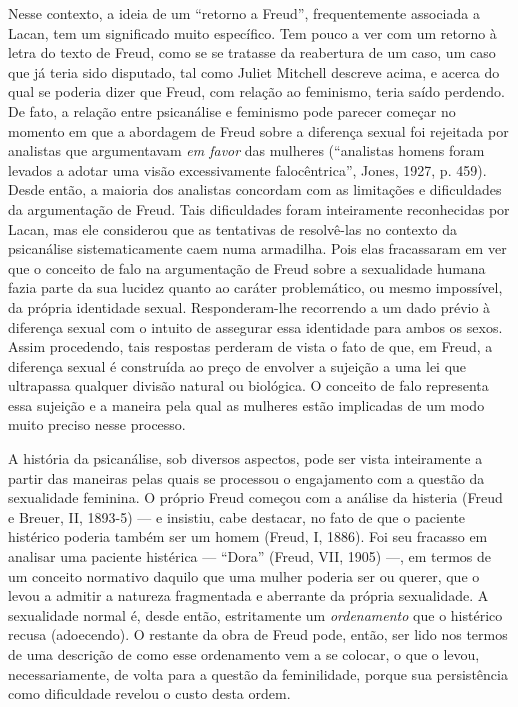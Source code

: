 Nesse contexto, a ideia de um ``retorno a Freud'', frequentemente
associada a Lacan, tem um significado muito específico. Tem pouco a ver
com um retorno à letra do texto de Freud, como se se tratasse da
reabertura de um caso, um caso que já teria sido disputado, tal como
Juliet Mitchell descreve acima, e acerca do qual se poderia dizer que
Freud, com relação ao feminismo, teria saído perdendo. De fato, a
relação entre psicanálise e feminismo pode parecer começar no momento em
que a abordagem de Freud sobre a diferença sexual foi rejeitada por
analistas que argumentavam \emph{em favor} das mulheres (``analistas
homens foram levados a adotar uma visão excessivamente falocêntrica'',
Jones, 1927, p. 459). Desde então, a maioria dos analistas concordam com
as limitações e dificuldades da argumentação de Freud. Tais dificuldades
foram inteiramente reconhecidas por Lacan, mas ele considerou que as
tentativas de resolvê-las no contexto da psicanálise sistematicamente
caem numa armadilha. Pois elas fracassaram em ver que o conceito de falo
na argumentação de Freud sobre a sexualidade humana fazia parte da sua
lucidez quanto ao caráter problemático, ou mesmo impossível, da própria
identidade sexual. Responderam-lhe recorrendo a um dado prévio à
diferença sexual com o intuito de assegurar essa identidade para ambos
os sexos. Assim procedendo, tais respostas perderam de vista o fato de
que, em Freud, a diferença sexual é construída ao preço de envolver a
sujeição a uma lei que ultrapassa qualquer divisão natural ou biológica.
O conceito de falo representa essa sujeição e a maneira pela qual as
mulheres estão implicadas de um modo muito preciso nesse processo.

A história da psicanálise, sob diversos aspectos, pode ser vista
inteiramente a partir das maneiras pelas quais se processou o
engajamento com a questão da sexualidade feminina. O próprio Freud
começou com a análise da histeria (Freud e Breuer, II, 1893-5) --- e
insistiu, cabe destacar, no fato de que o paciente histérico poderia
também ser um homem (Freud, I, 1886). Foi seu fracasso em analisar uma
paciente histérica --- ``Dora'' (Freud, VII, 1905) ---, em termos de um
conceito normativo daquilo que uma mulher poderia ser ou querer, que o
levou a admitir a natureza fragmentada e aberrante da própria
sexualidade. A sexualidade normal é, desde então, estritamente um
\emph{ordenamento} que o histérico recusa (adoecendo). O restante da
obra de Freud pode, então, ser lido nos termos de uma descrição de como
esse ordenamento vem a se colocar, o que o levou, necessariamente, de
volta para a questão da feminilidade, porque sua persistência como
dificuldade revelou o custo desta ordem.

